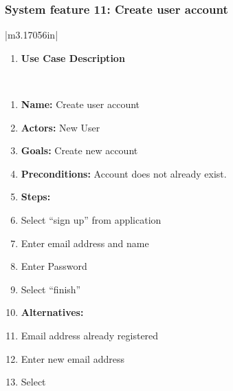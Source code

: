 \documentclass[letterpaper]{article}
\newcommand\textstyleDefaultParagraphFont[1]{#1}
\newcounter{saveenum}
\newcommand\liststyleLFOxiii{%
\renewcommand\theenumi{}
\renewcommand\labelenumi{\theenumi}
\renewcommand\labelitemi{[F0B7?]}
\renewcommand\labelitemii{o}
\renewcommand\labelitemiii{[F0A7?]}
}
\begin{document}
\subsubsection[System feature 11: Create user account]{\rmfamily System
feature 11: Create user account}
\begin{flushleft}
\tablehead{}
\begin{supertabular}{|m{3.17056in}|}
\hline
\liststyleLFOxiii
\begin{enumerate}
\item \sffamily\bfseries\color{black} Use Case
Description\end{enumerate}
\\\hline
\liststyleLFOxiii
\setcounter{saveenum}{\value{enumi}}
\begin{enumerate}
\setcounter{enumi}{\value{saveenum}}
\item \sffamily\color{black}
\textstyleDefaultParagraphFont{\textbf{Name:
}}\textstyleDefaultParagraphFont{Create user account}\item
\sffamily\color{black} \textstyleDefaultParagraphFont{\textbf{Actors:
}}\textstyleDefaultParagraphFont{New User}\item \sffamily\color{black}
\textstyleDefaultParagraphFont{\textbf{Goals:
}}\textstyleDefaultParagraphFont{Create new account}\item
\sffamily\color{black}
\textstyleDefaultParagraphFont{\textbf{Preconditions:
}}\textstyleDefaultParagraphFont{Account does not already exist.}\item
\sffamily\bfseries\color{black} Steps: \item \sffamily\color{black}
\textstyleDefaultParagraphFont{Select {\textquotedblleft}sign
up{\textquotedblright} from application}\item \sffamily\color{black}
\textstyleDefaultParagraphFont{Enter email address and name}\item
\sffamily\color{black} \textstyleDefaultParagraphFont{Enter
Password}\item \sffamily\color{black}
\textstyleDefaultParagraphFont{Select
{\textquotedblleft}finish{\textquotedblright}}\item
\sffamily\bfseries\color{black} Alternatives: \item
\sffamily\color{black} \textstyleDefaultParagraphFont{Email address
already registered}\item \sffamily\color{black}
\textstyleDefaultParagraphFont{Enter new email address}\item
\sffamily\color{black} \textstyleDefaultParagraphFont{Select
}
\end{enumerate}
\end{supertabular}
\end{flushleft}
\end{document}
